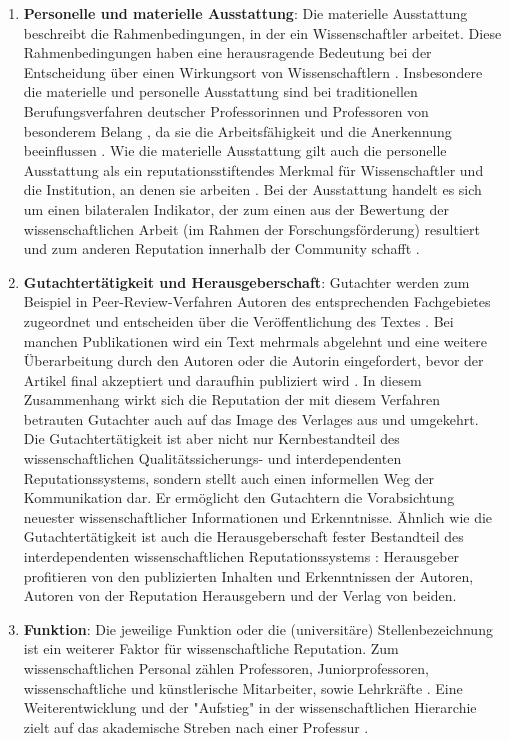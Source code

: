 \begin{enumerate}
\item \textbf{Personelle und materielle Ausstattung}: Die materielle Ausstattung beschreibt die Rahmenbedingungen, in der ein Wissenschaftler arbeitet. Diese Rahmenbedingungen haben eine herausragende Bedeutung bei der Entscheidung über einen Wirkungsort von Wissenschaftlern \cite{Mayntz_2008}. Insbesondere die materielle und personelle Ausstattung sind bei traditionellen Berufungsverfahren deutscher Professorinnen und Professoren von besonderem Belang \cite{Himpele_2011}, da sie die Arbeitsfähigkeit und die Anerkennung beeinflussen \cite{Buss_2001}. Wie die materielle Ausstattung gilt auch die personelle Ausstattung als ein reputationsstiftendes Merkmal für Wissenschaftler und die Institution, an denen sie arbeiten \cite{Mayntz_2008}. Bei der Ausstattung handelt es sich um einen bilateralen Indikator, der zum einen aus der Bewertung der wissenschaftlichen Arbeit (im Rahmen der Forschungsförderung) resultiert \cite{Herb_2008} und  zum anderen Reputation innerhalb der Community schafft \cite{Mayntz_2008}.
\item \textbf{Gutachtertätigkeit und Herausgeberschaft}: Gutachter werden zum Beispiel in Peer-Review-Verfahren Autoren des entsprechenden Fachgebietes zugeordnet und entscheiden über die Veröffentlichung des Textes \cite{Frey_2005}. Bei manchen Publikationen wird ein Text mehrmals abgelehnt und eine weitere Überarbeitung durch den Autoren oder die Autorin eingefordert, bevor der Artikel final akzeptiert und daraufhin publiziert wird \cite{Frey_2005}. In diesem Zusammenhang wirkt sich die Reputation der mit diesem Verfahren betrauten Gutachter auch auf das Image des Verlages aus und umgekehrt. Die Gutachtertätigkeit ist aber nicht nur Kernbestandteil des wissenschaftlichen Qualitätssicherungs- und interdependenten Reputationssystems, sondern stellt auch einen informellen Weg der Kommunikation dar. Er ermöglicht den Gutachtern die Vorabsichtung neuester wissenschaftlicher Informationen und Erkenntnisse. Ähnlich wie die Gutachtertätigkeit ist auch die Herausgeberschaft fester Bestandteil des interdependenten wissenschaftlichen Reputationssystems \cite{Frey_2005}: Herausgeber profitieren von den publizierten Inhalten und Erkenntnissen der Autoren, Autoren von der Reputation Herausgebern und der Verlag von beiden.
\item \textbf{Funktion}: Die jeweilige Funktion oder die (universitäre) Stellenbezeichnung ist ein weiterer Faktor für wissenschaftliche Reputation. Zum wissenschaftlichen Personal zählen Professoren, Juniorprofessoren, wissenschaftliche und künstlerische Mitarbeiter, sowie Lehrkräfte \cite{Erhardt_2011}. Eine Weiterentwicklung und der "Aufstieg" in der wissenschaftlichen Hierarchie zielt auf das akademische Streben nach einer Professur \cite{Klecha_2008}.

\end{enumerate}
